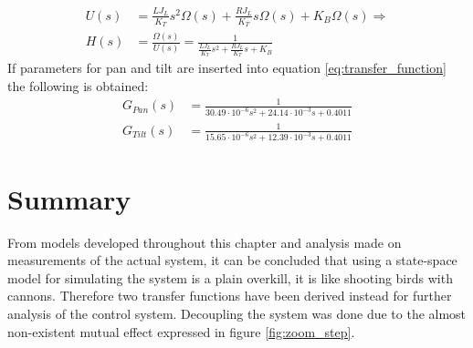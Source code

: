 \begin{align}
	U(s) &= \frac{L J_L}{K_T} s^2 \Omega(s) + \frac{R J_L}{K_T} s \Omega(s) + K_B \Omega(s) \Rightarrow\\
	H(s) &= \frac{\Omega(s)}{U(s)} = \frac{1}{\frac{L J_L}{K_T} s^2 + \frac{R J_L}{K_T} s + K_B}\label{eq:transfer_function}
\end{align}
If parameters for pan and tilt are inserted into equation \ref{eq:transfer_function} the following is obtained:
\begin{align}
	G_{Pan}(s) &= \frac{1}{30.49 \cdot 10^{-6} s^2 + 24.14 \cdot 10^{-3} s + 0.4011}\label{eq:transfer_function_pan}\\
	G_{Tilt}(s) &= \frac{1}{15.65 \cdot 10^{-6} s^2 + 12.39 \cdot 10^{-3} s + 0.4011}\label{eq:transfer_function_tilt}
\end{align}

\section{Summary}
From models developed throughout this chapter and analysis made on measurements of the actual system, it can be concluded that using a state-space model for simulating the system is a plain overkill, it is like shooting birds with cannons. Therefore two transfer functions have been derived instead for further analysis of the control system. Decoupling the system was done due to the almost non-existent mutual effect expressed in figure \ref{fig:zoom_step}. 
